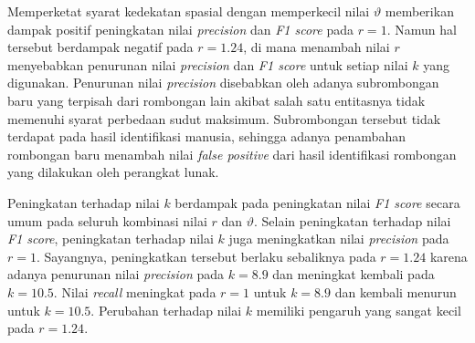 Memperketat syarat kedekatan spasial dengan memperkecil nilai $\vartheta$ memberikan dampak positif peningkatan nilai \textit{precision} dan \textit{F1 score} pada $r = 1$. Namun hal tersebut berdampak negatif pada $r = 1.24$, di mana menambah nilai $r$ menyebabkan penurunan nilai \textit{precision} dan \textit{F1 score} untuk setiap nilai $k$ yang digunakan. Penurunan nilai \textit{precision} disebabkan oleh adanya subrombongan baru yang terpisah dari rombongan lain akibat salah satu entitasnya tidak memenuhi syarat perbedaan sudut maksimum. Subrombongan tersebut tidak terdapat pada hasil identifikasi manusia, sehingga adanya penambahan rombongan baru menambah nilai \textit{false positive} dari hasil identifikasi rombongan yang dilakukan oleh perangkat lunak.

Peningkatan terhadap nilai $k$ berdampak pada peningkatan nilai \textit{F1 score} secara umum pada seluruh kombinasi nilai $r$ dan $\vartheta$. Selain peningkatan terhadap nilai \textit{F1 score}, peningkatan terhadap nilai $k$ juga meningkatkan nilai \textit{precision} pada $r = 1$. Sayangnya, peningkatkan tersebut berlaku sebaliknya pada $r = 1.24$ karena adanya penurunan nilai \textit{precision} pada $k = 8.9$ dan meningkat kembali pada $k = 10.5$. Nilai \textit{recall} meningkat pada $r = 1$ untuk $k = 8.9$ dan kembali menurun untuk $k = 10.5$. Perubahan terhadap nilai $k$ memiliki pengaruh yang sangat kecil pada $r = 1.24$.


